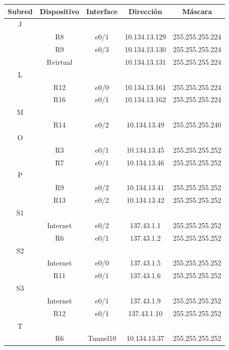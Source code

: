\documentclass[12pt, a4paper, spanish]{article}
\begin{document}
\begin{center}
\begin{tabular}{|c|c|c|c|c|}
	\hline
	Subred & Dispositivo & Interface & Dirección & Máscara \\
	\hline
	\hline
	J & & & & \\
	\hline
	 & R8 		& e0/1 	& 10.134.13.129 	& 255.255.255.224 \\
	\hline
	 & R9 		& e0/3 	& 10.134.13.130 	& 255.255.255.224 \\
	\hline
	 & Rvirtual 	& 		& 10.134.13.131 & 255.255.255.224 \\
	 \hline
	 \hline
	L & & & & \\
	\hline
	 & R12 		& e0/0 	& 10.134.13.161	& 255.255.255.224 \\
	\hline
	 & R16 		& e0/1 	& 10.134.13.162 	& 255.255.255.224 \\
	\hline
	\hline
	M & & & & \\
	\hline
	 & R14 		& e0/2 	& 10.134.13.49 	& 255.255.255.240 \\
	\hline
	\hline
	O & & & & \\
	\hline
	 & R3 		& e0/1 	& 10.134.13.45 	& 255.255.255.252 \\
	\hline
	 & R7 		& e0/1 	& 10.134.13.46 	& 255.255.255.252 \\
	\hline
	\hline
	P & & & & \\
	\hline
	 & R9 		& e0/2 	& 10.134.13.41 	& 255.255.255.252 \\
	\hline
	 & R13 		& e0/2 	& 10.134.13.42 	& 255.255.255.252 \\
	\hline
	\hline
	S1 & & & & \\
	\hline
	 & Internet 	& e0/2 	& 137.43.1.1 	& 255.255.255.252 \\
	\hline
	 & R6 		& e0/1 	& 137.43.1.2 	& 255.255.255.252 \\
	\hline
	\hline
	S2 & & & & \\
	\hline
	 & Internet 	& e0/0 	& 137.43.1.5 	& 255.255.255.252 \\
	\hline
	 & R11 		& e0/1 	& 137.43.1.6 	& 255.255.255.252 \\
	\hline
	\hline
	S3 & & & & \\
	\hline
	 & Internet 	& e0/1 	& 137.43.1.9 	& 255.255.255.252 \\
	\hline
	 & R12 		& e0/1 	& 137.43.1.10 	& 255.255.255.252 \\
	\hline
	\hline
	T & & & & \\
	\hline
	 & R6 		& Tunnel10 & 10.134.13.37 & 255.255.255.252 \\

\end{tabular}
\end{center}
\end{document}
